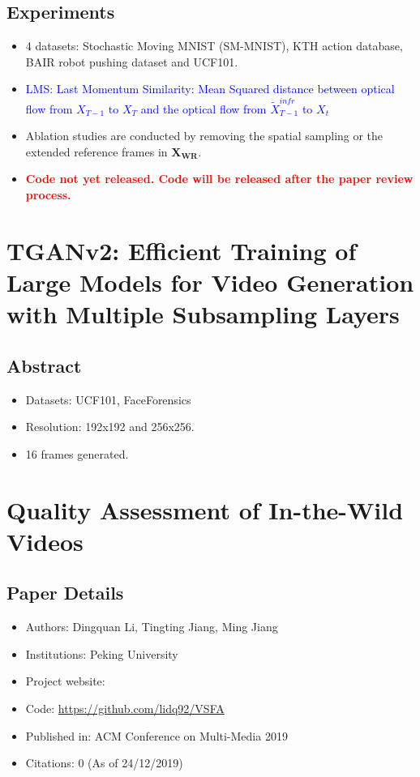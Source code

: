 \documentclass{article}
\begin{document}
    \subsection{Experiments}\label{subsec:Stochastic_Dynamics_for_Video_Infilling_(SDVI):experiments}
    \begin{itemize}
        \item 4 datasets: Stochastic Moving MNIST (SM-MNIST), KTH action database, BAIR robot pushing dataset and UCF101.
        \item \textcolor{blue}{LMS: Last Momentum Similarity: Mean Squared distance between optical flow from $X_{T-1}$ to $X_T$ and the optical flow from $\tilde{X}_{T-1}^{infr}$ to $X_t$}
        \item Ablation studies are conducted by removing the spatial sampling or the extended reference frames in $\mathbf{X_{WR}}$.
        \item \textcolor{red}{\textbf{Code not yet released.
        Code will be released after the paper review process.} }
    \end{itemize}
    \newpage


    \section{TGANv2: Efficient Training of Large Models for Video Generation with Multiple Subsampling Layers}\label{sec:TGANv2_Efficient_Training_of_Large_Models_for_Video_Generation_with_Multiple_Subsampling_Layers}
    \subsection*{Abstract}
    \begin{itemize}
        \item Datasets: UCF101, FaceForensics
        \item Resolution: 192x192 and 256x256.
        \item 16 frames generated.
    \end{itemize}
    \newpage


    \section{Quality Assessment of In-the-Wild Videos}\label{sec:Quality_Assessment_of_In_the_Wild_Videos}
    \subsection*{Paper Details}
    \begin{itemize}
        \item Authors: Dingquan Li, Tingting Jiang, Ming Jiang
        \item Institutions: Peking University
        \item Project website:
        \item Code: \url{https://github.com/lidq92/VSFA}
        \item Published in: ACM Conference on Multi-Media 2019
        \item Citations: 0 (As of 24/12/2019)
    \end{itemize}
\end{document}
